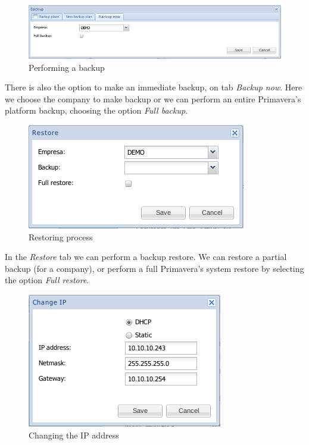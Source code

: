 \begin{figure}[H]
    \begin{center}
    \includegraphics[scale=0.5]{screenshots/primavera/primaverainterface_04.png}
    \caption{Performing a backup}
    \label{fig:primavera_backup_now}
    \end{center}
\end{figure}

There is also the option to make an immediate backup, on tab \textit{Backup now}.
Here we choose the company to make backup or we can perform an entire Primavera's platform backup, choosing the option \textit{Full backup}.

\begin{figure}[H]
    \begin{center}
    \includegraphics[scale=0.6]{screenshots/primavera/primaverainterface_05.png}
    \caption{Restoring process}
    \label{fig:primavera_restore}
    \end{center}
\end{figure}
In the \textit{Restore} tab we can perform a backup restore.
We can restore a partial backup (for a company), or perform a full Primavera's system restore by selecting the option \textit{Full restore}. 

\begin{figure}[H]
    \begin{center}
    \includegraphics[scale=0.6]{screenshots/primavera/primaverainterface_06.png}
    \caption{Changing the IP address}
    \label{fig:primavera_change_ip}
    \end{center}
\end{figure}

